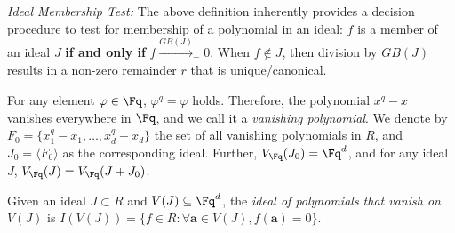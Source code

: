 

{\it Ideal Membership Test:} The above definition inherently provides
a decision procedure to test for membership of a polynomial in an ideal:
$f$ is a member of an ideal $J$ {\bf if and only if} 
$f\xrightarrow{GB(J)}_+0$.
When $f\notin J$,
then division by $GB(J)$ results in a non-zero remainder $r$ that is
unique/canonical. 



For any element $\varphi\in\Fq$,
$\varphi^q=\varphi$ holds. Therefore, the polynomial $x^q-x$ vanishes
everywhere in $\Fq$, and we call it a {\it vanishing polynomial}. We
denote by $F_0 = \{x_1^q-x_1,\dots,x_d^q-x_d\}$ the set of all vanishing
polynomials in $R$, and  $J_0 = \langle F_0 \rangle$
as the corresponding ideal. Further,
$V_{\Fq}(J_0) = \Fq^d$, and for any ideal $J$,
$V_{\Fq}(J)=V_{\Fq}(J+J_0)$. 


\begin{Definition}
Given an ideal $J\subset R$ and $V(J) \subseteq \Fq^d$, the {\it ideal
of polynomials that vanish on} $V(J)$ is $I(V(J)) = \{ f \in R :
\forall \bm{a} \in V(J), f(\bm{a}) = 0\}$.
\end{Definition}

